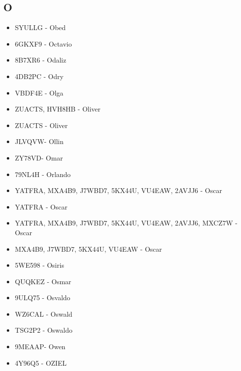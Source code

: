 \subsection*{O}
\begin{itemize}[leftmargin=*,nosep]
\item SYULLG - Obed
\item 6GKXF9 - Octavio
\item 8B7XR6 - Odaliz
\item 4DB2PC - Odry
\item VBDF4E - Olga
\item ZUACTS, HVH8HB - Oliver
\item ZUACTS - Oliver
\item JLVQVW- Ollin
\item ZY78VD- Omar
\item 79NL4H - Orlando
\item YATFRA, MXA4B9, J7WBD7, 5KX44U, VU4EAW, 2AVJJ6 - Oscar
\item YATFRA - Oscar
\item YATFRA, MXA4B9, J7WBD7, 5KX44U, VU4EAW, 2AVJJ6, MXCZ7W - Oscar
\item MXA4B9, J7WBD7, 5KX44U, VU4EAW - Oscar
\item 5WE598 - Osiris
\item QUQKEZ - Osmar
\item 9ULQ75 - Osvaldo
\item WZ6CAL - Oswald
\item TSG2P2 - Oswaldo
\item 9MEAAP- Owen
\item 4Y96Q5 - OZIEL
\end{itemize}

